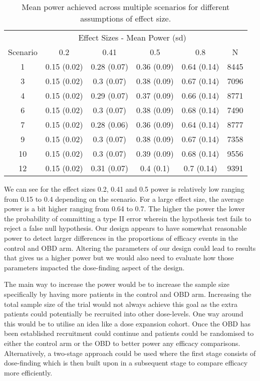 \begin{table}[h!]
	
	\caption{\label{tab_wt:Power-Calcs}Mean power achieved across multiple scenarios for different assumptions of effect size.}
	\centering
	\begin{tabular}[t]{cccccc}
		\toprule
		\multicolumn{1}{c}{ } & \multicolumn{4}{c}{Effect Sizes - Mean Power (sd)} & \multicolumn{1}{c}{ } \\
		\cmidrule(l{3pt}r{3pt}){2-5}
		Scenario & 0.2 & 0.41 & 0.5 & 0.8 & N\\
		\midrule
		1 & 0.15 (0.02) & 0.28 (0.07) & 0.36 (0.09) & 0.64 (0.14) & 8445\\
		3 & 0.15 (0.02) & 0.3 (0.07) & 0.38 (0.09) & 0.67 (0.14) & 7096\\
		4 & 0.15 (0.02) & 0.29 (0.07) & 0.37 (0.09) & 0.66 (0.14) & 8771\\
		6 & 0.15 (0.02) & 0.3 (0.07) & 0.38 (0.09) & 0.68 (0.14) & 7490\\
		7 & 0.15 (0.02) & 0.28 (0.06) & 0.36 (0.09) & 0.64 (0.14) & 8777\\
		9 & 0.15 (0.02) & 0.3 (0.07) & 0.38 (0.09) & 0.67 (0.14) & 7358\\
		10 & 0.15 (0.02) & 0.3 (0.07) & 0.39 (0.09) & 0.68 (0.14) & 9556\\
		12 & 0.15 (0.02) & 0.31 (0.07) & 0.4 (0.1) & 0.7 (0.14) & 9391\\
		\bottomrule
	\end{tabular}
\end{table}

We can see for the effect sizes 0.2, 0.41 and 0.5 power is relatively low ranging from 0.15 to 0.4 depending on the scenario. For a large effect size, the average power is a bit higher ranging from 0.64 to 0.7. The higher the power the lower the probability of committing a type \RN{2} error wherein the hypothesis test fails to reject a false null hypothesis. Our design appears to have somewhat reasonable power to detect larger differences in the proportions of efficacy events in the control and OBD arm. Altering the parameters of our design could lead to results that gives us a higher power but we would also need to evaluate how those parameters impacted the dose-finding aspect of the design.   

The main way to increase the power would be to increase the sample size specifically by having more patients in the control and OBD arm. Increasing the total sample size of the trial would not always achieve this goal as the extra patients could potentially be recruited into other dose-levels. One way around this would be to utilise an idea like a dose expansion cohort. Once the OBD has been established recruitment could continue and patients could be randomised to either the control arm or the OBD to better power any efficacy comparisons. Alternatively, a two-stage approach could be used where the first stage consists of dose-finding which is then built upon in a subsequent stage to compare efficacy more efficiently. 

